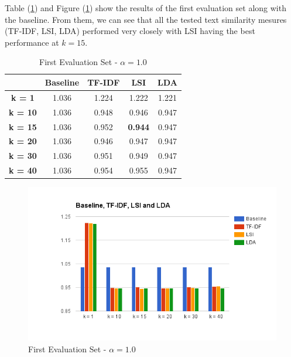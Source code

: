 \documentclass{sigish}
\begin{document}
Table (\ref{tab:eval_01}) and Figure (\ref{fig:eval_01}) show the results of the first evaluation set along with the baseline. From them, we can see that all the tested text similarity mesures (TF-IDF, LSI, LDA) performed very closely with LSI having the best performance at $ k = 15 $.

\begin{table}[]
\centering
\begin{tabular}{|c|c|c|c|c|}
\hline
                & \textbf{Baseline} & \textbf{TF-IDF} & \textbf{LSI}   & \textbf{LDA} \\ \hline
\textbf{k = 1}  & 1.036             & 1.224           & 1.222          & 1.221            \\ \hline
\textbf{k = 10} & 1.036             & 0.948           & 0.946          & 0.947            \\ \hline
\textbf{k = 15} & 1.036             & 0.952           & \textbf{0.944} & 0.947            \\ \hline
\textbf{k = 20} & 1.036             & 0.946           & 0.947          & 0.947            \\ \hline
\textbf{k = 30} & 1.036             & 0.951           & 0.949          & 0.947            \\ \hline
\textbf{k = 40} & 1.036             & 0.954           & 0.955          & 0.947            \\ \hline
\end{tabular}
\caption{First Evaluation Set - $ \alpha = 1.0 $}
\label{tab:eval_01}
\end{table}

\begin{figure}
\centering
\includegraphics[width=\columnwidth]{images/evaluations.png}
\caption{First Evaluation Set - $ \alpha = 1.0 $}
\label{fig:eval_01}
\end{figure}
\end{document}
